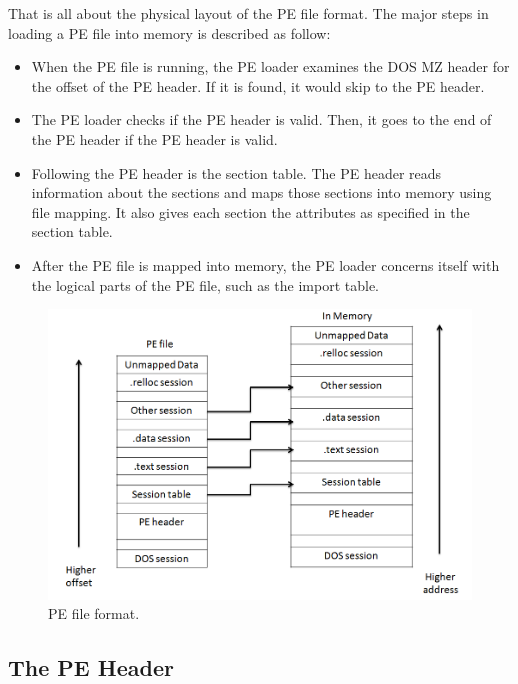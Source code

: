 That is all about the physical layout of the PE file format. The major steps in loading a PE file into memory is described as follow:

\begin{itemize}
\item When the PE file is running, the PE loader examines the DOS MZ header for the offset of the PE header. If it is found, it would skip to the PE header.
\item The PE loader checks if the PE header is valid. Then, it goes to the end of the PE header if the PE header is valid.
\item Following the PE header is the section table. The PE header reads information about the sections and maps those sections into memory using file mapping. It also gives each section the attributes as specified in the section table.
\item After the PE file is mapped into memory, the PE loader concerns itself with the logical parts of the PE file, such as the import table.
\end{itemize}
\begin{figure}[h!]
\centering
\includegraphics[width=1\textwidth]{graph/pe1.png}
\caption{PE file format.}
\label{fig:pe1}
\end{figure}


\subsection{The PE Header}


